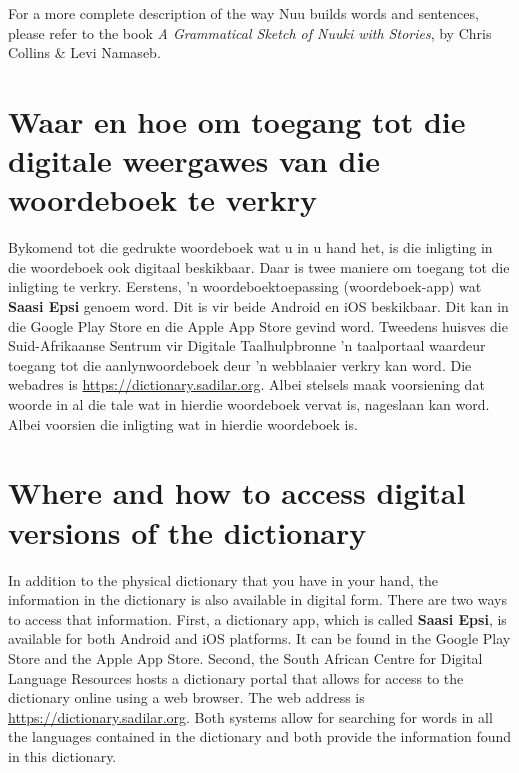 For a more complete description of the way N\textipa{\textvertline}uu
builds words and sentences, please refer to the book \emph{A
Grammatical Sketch of N\textipa{\textvertline}uuki with Stories}, by
Chris Collins \& Levi Namaseb.


\markboth{}{}
\section{Waar en hoe om toegang tot die digitale weergawes van die
woordeboek te verkry}
\markboth{}{}

Bykomend tot die gedrukte woordeboek wat u in u hand het, is die
inligting in die woordeboek ook digitaal beskikbaar. Daar is twee
maniere om toegang tot die inligting te verkry. Eerstens, 'n
woordeboektoepassing (woordeboek-app) wat \textbf{Saasi Epsi} genoem
word. Dit is vir beide Android en iOS beskikbaar. Dit kan in die
Google Play Store en die Apple App Store gevind word. Tweedens huisves
die Suid-Afrikaanse Sentrum vir Digitale Taalhulpbronne 'n taalportaal
waardeur toegang tot die aanlynwoordeboek deur 'n webblaaier verkry
kan word. Die webadres is \url{https://dictionary.sadilar.org}. Albei
stelsels maak voorsiening dat woorde in al die tale wat in hierdie
woordeboek vervat is, nageslaan kan word. Albei voorsien die inligting
wat in hierdie woordeboek is.


\markboth{}{}
\addtocounter{section}{-1}
\tocless\section{Where and how to access digital versions of the dictionary}
{}
\markboth{}{}

In addition to the physical dictionary that you have in your hand, the
information in the dictionary is also available in digital form. There
are two ways to access that information. First, a dictionary app,
which is called \textbf{Saasi Epsi}, is available for both Android and
iOS platforms. It can be found in the Google Play Store and the Apple
App Store. Second, the South African Centre for Digital Language
Resources hosts a dictionary portal that allows for access to the
dictionary online using a web browser. The web address is
\url{https://dictionary.sadilar.org}. Both systems allow for searching
for words in all the languages contained in the dictionary and both
provide the information found in this dictionary.

